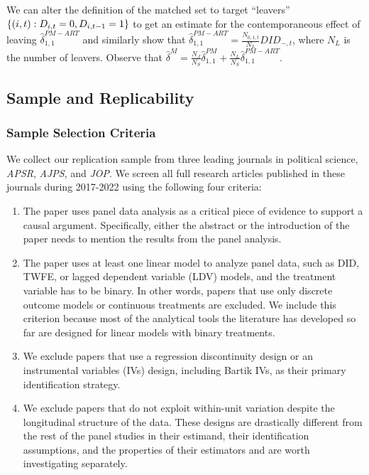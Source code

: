 \documentclass[12pt]{article}
\begin{document}
We can alter the definition of the matched set to target ``leavers'' $\{(i,t):D_{i,t}=0, D_{i,t-1}=1\}$ to get an estimate for the contemporaneous effect of leaving $\hat\delta^{PM-ART}_{1,1}$ and similarly show that $\hat\delta^{PM-ART}_{1,1}=\frac{N_{0,1,t}}{N_L}DID_{-,t}$, where $N_L$ is the number of leavers.
Observe that $\hat\delta^M=\frac{N_J}{N_S}\hat\delta^{PM}_{1,1}+\frac{N_L}{N_S}\hat\delta^{PM-ART}_{1,1}$.

    

\clearpage


\subsection{Sample and Replicability}

\subsubsection{Sample Selection Criteria}

We collect our replication sample from three leading journals in political science, \emph{APSR}, \emph{AJPS}, and \emph{JOP}. We screen all full research articles published in these journals during 2017-2022 using the following four criteria: 
\begin{enumerate}
    \item The paper uses panel data analysis as a critical piece of evidence to support a causal argument. Specifically, either the abstract or the introduction of the paper needs to mention the results from the panel analysis.
    \item The paper uses at least one linear model to analyze panel data, such as DID, TWFE, or lagged dependent variable (LDV) models, and the treatment variable has to be binary. In other words, papers that use only discrete outcome models or continuous treatments are excluded. We include this criterion because most of the analytical tools the literature has developed so far are designed for linear models with binary treatments.
    \item  We exclude papers that use a regression discontinuity design or an instrumental variables (IVs) design, including Bartik IVs, as their primary identification strategy.
    \item We exclude papers that do not exploit within-unit variation despite the longitudinal structure of the data. These designs are drastically different from the rest of the panel studies in their estimand, their identification assumptions, and the properties of their estimators and are worth investigating separately. 
\end{enumerate}
\clearpage
\end{document}
